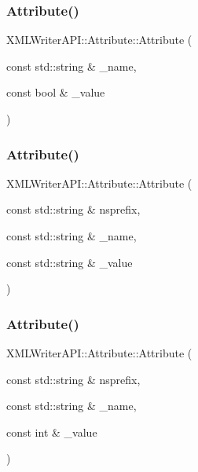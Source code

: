 \mbox{\label{classXMLWriterAPI_1_1Attribute_ad16e250869a26c1058a73cd9faef5d2f}} 
\subsubsection{\texorpdfstring{Attribute()}{Attribute()}\hspace{0.1cm}{\footnotesize\ttfamily [55/66]}}
{\footnotesize\ttfamily X\+M\+L\+Writer\+A\+P\+I\+::\+Attribute\+::\+Attribute (\begin{DoxyParamCaption}\item[{const std\+::string \&}]{\+\_\+name,  }\item[{const bool \&}]{\+\_\+value }\end{DoxyParamCaption})}

\mbox{\label{classXMLWriterAPI_1_1Attribute_af62de63beb69186f082ce7f612514115}} 
\subsubsection{\texorpdfstring{Attribute()}{Attribute()}\hspace{0.1cm}{\footnotesize\ttfamily [56/66]}}
{\footnotesize\ttfamily X\+M\+L\+Writer\+A\+P\+I\+::\+Attribute\+::\+Attribute (\begin{DoxyParamCaption}\item[{const std\+::string \&}]{nsprefix,  }\item[{const std\+::string \&}]{\+\_\+name,  }\item[{const std\+::string \&}]{\+\_\+value }\end{DoxyParamCaption})}

\mbox{\label{classXMLWriterAPI_1_1Attribute_a9e412b0bd0a009de13ec17416e18e5b0}} 
\subsubsection{\texorpdfstring{Attribute()}{Attribute()}\hspace{0.1cm}{\footnotesize\ttfamily [57/66]}}
{\footnotesize\ttfamily X\+M\+L\+Writer\+A\+P\+I\+::\+Attribute\+::\+Attribute (\begin{DoxyParamCaption}\item[{const std\+::string \&}]{nsprefix,  }\item[{const std\+::string \&}]{\+\_\+name,  }\item[{const int \&}]{\+\_\+value }\end{DoxyParamCaption})}

